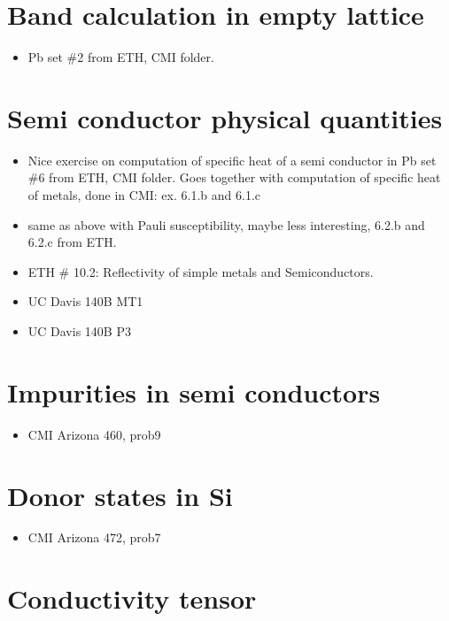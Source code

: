 \section{Band calculation in empty lattice}

\begin{itemize}
\item Pb set \#2 from ETH, CMI folder.
\end{itemize}

\section{Semi conductor physical quantities}

\begin{itemize}
\item Nice exercise on computation of specific heat of a semi
  conductor in Pb set \#6 from ETH, CMI folder. Goes together with
  computation of specific heat of metals, done in CMI: ex. 6.1.b and
  6.1.c
\item same as above with Pauli susceptibility, maybe less interesting,
  6.2.b and 6.2.c from ETH.
\item ETH \# 10.2: Reflectivity of simple metals and Semiconductors.
\item UC Davis 140B MT1
\item UC Davis 140B P3
\end{itemize}

\section{Impurities in semi conductors}

\begin{itemize}
\item CMI Arizona 460, prob9
\end{itemize}

\section{Donor states in Si}

\begin{itemize}
\item CMI Arizona 472, prob7
\end{itemize}


\section{Conductivity tensor}

